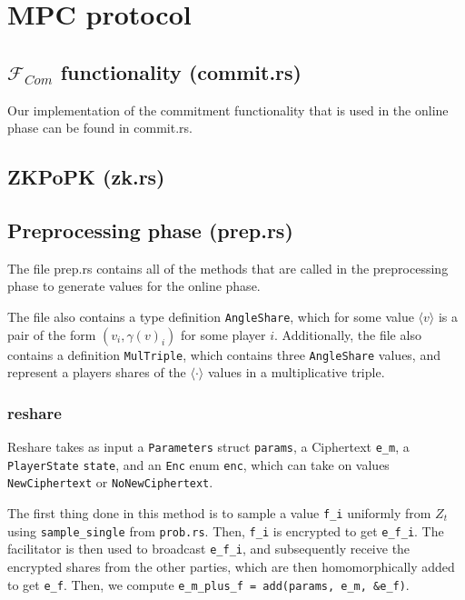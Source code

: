 \documentclass[../main.tex]{subfiles}
\begin{document}
\section{MPC protocol}

\subsection{$\mathcal{F}_{Com}$ functionality (commit.rs)}
Our implementation of the commitment functionality that is used in the online phase can be found in commit.rs.

\subsection{ZKPoPK (zk.rs)}

\subsection{Preprocessing phase (prep.rs)}
The file prep.rs contains all of the methods that are called in the preprocessing phase to generate values for the online phase.

The file also contains a type definition \lstinline{AngleShare}, which for some value $\langle v \rangle$ is a pair of the form $(v_i, \gamma(v)_i)$ for some player $i$. Additionally, the file also contains a definition \lstinline{MulTriple}, which contains three \lstinline{AngleShare} values, and represent a players shares of the $\langle \cdot \rangle$ values in a multiplicative triple. %
\subsubsection{reshare}
Reshare takes as input a \lstinline{Parameters} struct \lstinline{params}, a Ciphertext \lstinline{e_m}, a  \lstinline{PlayerState} \lstinline{state}, and an \lstinline{Enc} enum \lstinline{enc}, which can take on values \lstinline{NewCiphertext} or \lstinline{NoNewCiphertext}.

The first thing done in this method is to sample a value \lstinline{f_i} uniformly from $Z_t$ using \lstinline{sample_single} from \lstinline{prob.rs}. Then, \lstinline{f_i} is encrypted to get \lstinline{e_f_i}.
The facilitator is then used to broadcast \lstinline{e_f_i}, and subsequently receive the encrypted shares from the other parties, which are then homomorphically added to get \lstinline{e_f}. Then, we compute \lstinline{e_m_plus_f = add(params, e_m, &e_f)}.
\end{document}
